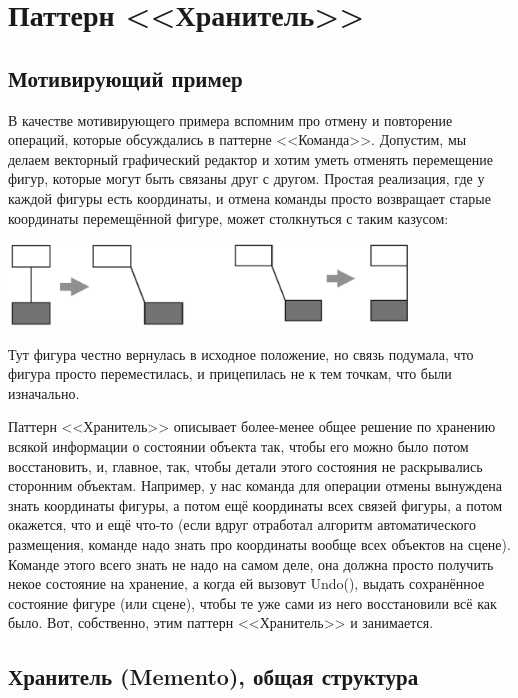 \documentclass{../text-style}
\begin{document}
\section{Паттерн <<Хранитель>>}

\subsection{Мотивирующий пример}

В качестве мотивирующего примера вспомним про отмену и повторение операций, которые обсуждались в паттерне <<Команда>>. Допустим, мы делаем векторный графический редактор и хотим уметь отменять перемещение фигур, которые могут быть связаны друг с другом. Простая реализация, где у каждой фигуры есть координаты, и отмена команды просто возвращает старые координаты перемещённой фигуре, может столкнуться с таким казусом:

\begin{center}
    \includegraphics[width=0.8\textwidth]{mementoMotivation.png}
\end{center}

Тут фигура честно вернулась в исходное положение, но связь подумала, что фигура просто переместилась, и прицепилась не к тем точкам, что были изначально.

Паттерн <<Хранитель>> описывает более-менее общее решение по хранению всякой информации о состоянии объекта так, чтобы его можно было потом восстановить, и, главное, так, чтобы детали этого состояния не раскрывались сторонним объектам. Например, у нас команда для операции отмены вынуждена знать координаты фигуры, а потом ещё координаты всех связей фигуры, а потом окажется, что и ещё что-то (если вдруг отработал алгоритм автоматического размещения, команде надо знать про координаты вообще всех объектов на сцене). Команде этого всего знать не надо на самом деле, она должна просто получить некое состояние на хранение, а когда ей вызовут Undo(), выдать сохранённое состояние фигуре (или сцене), чтобы те уже сами из него восстановили всё как было. Вот, собственно, этим паттерн <<Хранитель>> и занимается.

\subsection{Хранитель (Memento), общая структура}
\end{document}
